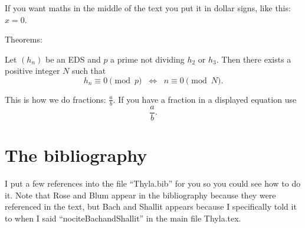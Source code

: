 If you want maths in the middle of the text you put it in dollar
signs, like this: $x = 0$.

Theorems:

\begin{thm} \label{t:regular primes}

Let $(h_n)$ be an EDS and $p$ a prime not dividing $h_2$ or $h_3$.
Then there exists a positive integer $N$ such that
\[ h_n \equiv 0 \pmod p \; \; \Leftrightarrow \; \; n \equiv 0 \pmod N. \]

\end{thm}


\smallskip

This is how we do fractions:  $\frac{a}{b}$.  If you have a
fraction in a displayed equation use
\[ \dfrac{a}{b}. \]

\section{The bibliography}

I put a few references into the file ``Thyla.bib'' for you so you
could see how to do it.  Note that Rose and Blum appear in the
bibliography because they were referenced in the text, but Bach
and Shallit appears because I specifically told it to when I said
``nocite{BachandShallit}'' in the main file Thyla.tex.

